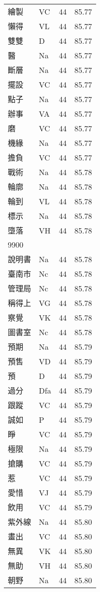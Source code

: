 \documentclass[twocolumn]{book}
\begin{document}
\begin{supertabular}{llrr}
繪製 & VC & 44 &  85.77\\
懶得 & VL & 44 &  85.77\\
雙雙 & D & 44 &  85.77\\
醫 & Na & 44 &  85.77\\
斷層 & Na & 44 &  85.77\\
擺設 & VC & 44 &  85.77\\
點子 & Na & 44 &  85.77\\
辦事 & VA & 44 &  85.77\\
磨 & VC & 44 &  85.77\\
機緣 & Na & 44 &  85.77\\
擔負 & VC & 44 &  85.77\\
戰術 & Na & 44 &  85.78\\
輪廓 & Na & 44 &  85.78\\
輪到 & VL & 44 &  85.78\\
標示 & Na & 44 &  85.78\\
墮落 & VH & 44 &  85.78\\
9900\\
說明書 & Na & 44 &  85.78\\
臺南市 & Nc & 44 &  85.78\\
管理局 & Nc & 44 &  85.78\\
稱得上 & VG & 44 &  85.78\\
察覺 & VK & 44 &  85.78\\
圖書室 & Nc & 44 &  85.78\\
預期 & Na & 44 &  85.79\\
預售 & VD & 44 &  85.79\\
預 & D & 44 &  85.79\\
過分 & Dfa & 44 &  85.79\\
跟蹤 & VC & 44 &  85.79\\
誠如 & P & 44 &  85.79\\
睜 & VC & 44 &  85.79\\
極限 & Na & 44 &  85.79\\
搶購 & VC & 44 &  85.79\\
惹 & VC & 44 &  85.79\\
愛惜 & VJ & 44 &  85.79\\
飲用 & VC & 44 &  85.79\\
紫外線 & Na & 44 &  85.80\\
畫出 & VC & 44 &  85.80\\
無異 & VK & 44 &  85.80\\
無助 & VH & 44 &  85.80\\
朝野 & Na & 44 &  85.80\\

\end{supertabular}
\end{document}
